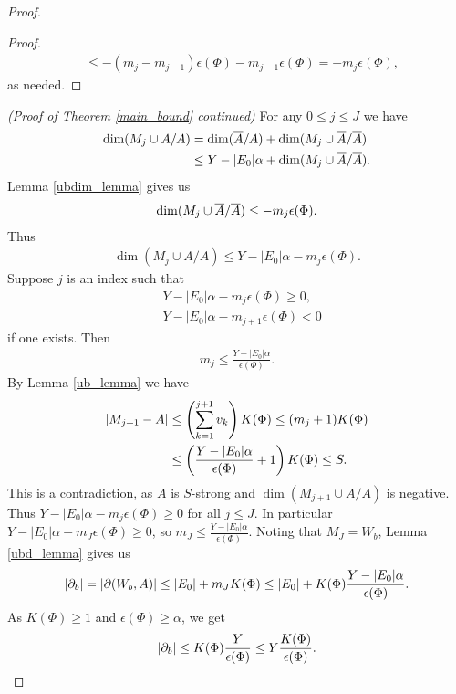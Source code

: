 \documentclass{amsart}
\begin{document}
\begin{proof}
\begin{proof}
\begin{align*}
      &\leq  -(m_j - m_{j-1})\epsilon(\Phi) - m_{j-1}  \epsilon(\Phi) =  - m_j  \epsilon(\Phi),
    \end{align*}
    as needed.
  \end{proof}
  \textit{(Proof of Theorem \ref{main_bound} continued)}
  For any $0 \leq j \leq J$ we have
  \begin{align*}
    \dim(M_j \cup A / A) &= \dim(\overline{A} / A) + \dim(M_j \cup \overline{A} / \overline{A}) \\
    &\leq Y - |E_0|\alpha + \dim(M_j \cup \overline{A} / \overline{A}).
  \end{align*}
  Lemma \ref{ubdim_lemma} gives us
  \begin{align*}
    \dim(M_j \cup \overline{A} / \overline{A}) \leq -m_j  \epsilon(\Phi).
  \end{align*}
  Thus
  \begin{align*}
    \dim(M_j \cup A / A) \leq Y - |E_0| \alpha - m_j  \epsilon(\Phi).
  \end{align*}
  Suppose $j$ is an index such that
  \begin{align*}
    &Y - |E_0| \alpha - m_j  \epsilon(\Phi) \geq 0, \\
    &Y - |E_0| \alpha - m_{j+1}  \epsilon(\Phi) < 0
  \end{align*}
  if one exists.
  Then 
  \begin{align*}
    m_j \leq \frac{Y - |E_0| \alpha}{\epsilon(\Phi)}.
  \end{align*}
  By Lemma \ref{ub_lemma} we have
  \begin{align*}
    \left|M_{j+1} - A\right| &\leq \left(\sum_{k=1}^{j+1} v_{k}\right) K(\Phi) \leq (m_j + 1) K(\Phi) \\
                     &\leq \left(\frac{Y - |E_0| \alpha}{\epsilon(\Phi)} + 1\right) K(\Phi) \leq S.
  \end{align*}
  This is a contradiction, as $A$ is $S$-strong and $\dim(M_{j+1} \cup A / A)$ is negative.
  Thus $Y - |E_0| \alpha - m_j  \epsilon(\Phi) \geq 0$ for all $j \leq J$.
  In particular $Y - |E_0| \alpha - m_J  \epsilon(\Phi) \geq 0$, so $m_J \leq \frac{Y - |E_0| \alpha}{\epsilon(\Phi)}$.
  Noting that $M_J = W_b$, Lemma \ref{ubd_lemma} gives us 
  \begin{align*}
      |\partial_b| = |\partial(W_b, A)| \leq |E_0| + m_J  K(\Phi) \leq |E_0| + K(\Phi) \frac{Y - |E_0| \alpha}{\epsilon(\Phi)}.
  \end{align*}
  As $K(\Phi) \geq 1$ and $\epsilon(\Phi) \geq \alpha$, we get
  \begin{align*}
      |\ppp_b| \leq K(\Phi) \frac{Y}{\epsilon(\Phi)} \leq Y \frac{K(\Phi)}{\epsilon(\Phi)}.

\end{align*}
\end{proof}
\end{document}

